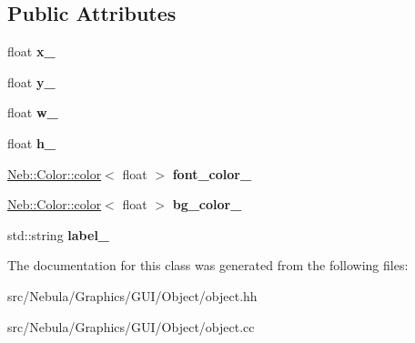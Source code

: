 \subsection*{Public Attributes}
\begin{DoxyCompactItemize}
\item 
\hypertarget{classNeb_1_1gui_1_1object_1_1Data_a7273b450412527b0ee04a2508dd05cce}{float {\bfseries x\-\_\-}}\label{classNeb_1_1gui_1_1object_1_1Data_a7273b450412527b0ee04a2508dd05cce}

\item 
\hypertarget{classNeb_1_1gui_1_1object_1_1Data_ada3026fdd107ddbe43a6de6430418901}{float {\bfseries y\-\_\-}}\label{classNeb_1_1gui_1_1object_1_1Data_ada3026fdd107ddbe43a6de6430418901}

\item 
\hypertarget{classNeb_1_1gui_1_1object_1_1Data_a174449b7b4c88c25d19efe06f022e4b7}{float {\bfseries w\-\_\-}}\label{classNeb_1_1gui_1_1object_1_1Data_a174449b7b4c88c25d19efe06f022e4b7}

\item 
\hypertarget{classNeb_1_1gui_1_1object_1_1Data_aba2bfb2f1819f911595e4e52ef2c761c}{float {\bfseries h\-\_\-}}\label{classNeb_1_1gui_1_1object_1_1Data_aba2bfb2f1819f911595e4e52ef2c761c}

\item 
\hypertarget{classNeb_1_1gui_1_1object_1_1Data_a03ed3fa05b542d10e31322ee627a40f4}{\hyperlink{classNeb_1_1Color_1_1color}{Neb\-::\-Color\-::color}$<$ float $>$ {\bfseries font\-\_\-color\-\_\-}}\label{classNeb_1_1gui_1_1object_1_1Data_a03ed3fa05b542d10e31322ee627a40f4}

\item 
\hypertarget{classNeb_1_1gui_1_1object_1_1Data_a097b47c78cc539d75e1a895a2a385748}{\hyperlink{classNeb_1_1Color_1_1color}{Neb\-::\-Color\-::color}$<$ float $>$ {\bfseries bg\-\_\-color\-\_\-}}\label{classNeb_1_1gui_1_1object_1_1Data_a097b47c78cc539d75e1a895a2a385748}

\item 
\hypertarget{classNeb_1_1gui_1_1object_1_1Data_a36135fece215ee3a34ca8f11e67b5b72}{std\-::string {\bfseries label\-\_\-}}\label{classNeb_1_1gui_1_1object_1_1Data_a36135fece215ee3a34ca8f11e67b5b72}

\end{DoxyCompactItemize}


The documentation for this class was generated from the following files\-:\begin{DoxyCompactItemize}
\item 
src/\-Nebula/\-Graphics/\-G\-U\-I/\-Object/object.\-hh\item 
src/\-Nebula/\-Graphics/\-G\-U\-I/\-Object/object.\-cc\end{DoxyCompactItemize}

